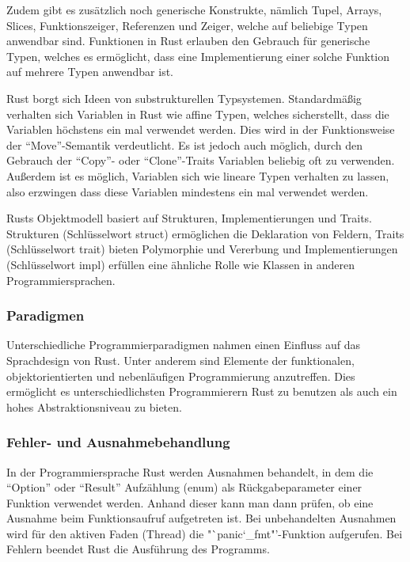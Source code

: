 Zudem gibt es zusätzlich noch generische Konstrukte, nämlich Tupel, Arrays, Slices, Funktionszeiger, Referenzen und Zeiger, welche
auf beliebige Typen anwendbar sind\cite{rustTypes}. Funktionen in Rust erlauben den Gebrauch für generische Typen, welches es
ermöglicht, dass eine Implementierung einer solche Funktion auf mehrere Typen anwendbar ist.

Rust borgt sich Ideen von substrukturellen Typsystemen\cite{linearTypePain}. Standardmäßig verhalten sich Variablen in Rust wie
affine Typen, welches sicherstellt, dass die Variablen höchstens ein mal verwendet werden\cite{substructuralTypesWikiEn}.
Dies wird in der Funktionsweise der "`Move"'-Semantik verdeutlicht\cite{linearTypePain}.
Es ist jedoch auch möglich, durch den Gebrauch der "`Copy"'- oder "`Clone"'-Traits Variablen
beliebig oft zu verwenden\cite{linearTypePain}.
Außerdem ist es möglich, Variablen sich wie lineare Typen verhalten zu lassen, also erzwingen dass diese Variablen mindestens
ein mal verwendet werden\cite{linearTypePain}.

Rusts Objektmodell basiert auf Strukturen, Implementierungen und Traits\cite{rustWikiEn}.
Strukturen (Schlüsselwort struct) ermöglichen die Deklaration von Feldern\cite{rustWikiEn}, 
Traits (Schlüsselwort trait) bieten Polymorphie und Vererbung
\cite{rustWikiEn} und Implementierungen (Schlüsselwort impl) erfüllen eine ähnliche Rolle wie Klassen in
anderen Programmiersprachen\cite{rustWikiEn}.

\subsubsection{Paradigmen}

Unterschiedliche Programmierparadigmen nahmen einen Einfluss auf das Sprachdesign von Rust\cite{rustWikiDe}.
Unter anderem sind Elemente der funktionalen, objektorientierten und nebenläufigen Programmierung anzutreffen\cite{rustWikiDe}.
Dies ermöglicht es unterschiedlichsten Programmierern Rust zu benutzen als auch ein hohes Abstraktionsniveau zu
bieten\cite{rustWikiDe}.

\subsubsection{Fehler- und Ausnahmebehandlung}

In der Programmiersprache Rust werden Ausnahmen behandelt, in dem die "`Option"' oder "`Result"' Aufzählung (enum) als
Rückgabeparameter einer Funktion verwendet werden. Anhand dieser kann man dann prüfen, ob eine Ausnahme beim Funktionsaufruf
aufgetreten ist. Bei unbehandelten Ausnahmen wird für den aktiven Faden (Thread) die "`panic\char`_fmt"'-Funktion aufgerufen.
Bei Fehlern beendet Rust die Ausführung des Programms. 

